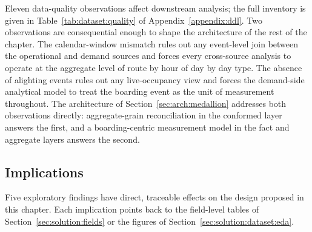 Eleven data-quality observations affect downstream analysis; the full
inventory is given in Table~\ref{tab:dataset:quality} of
Appendix~\ref{appendix:ddl}. Two observations are consequential enough
to shape the architecture of the rest of the chapter. The
calendar-window mismatch rules out any event-level join between the
operational and demand sources and forces every cross-source analysis
to operate at the aggregate level of route by hour of day by day type.
The absence of alighting events rules out any live-occupancy view and
forces the demand-side analytical model to treat the boarding event as
the unit of measurement throughout. The architecture of
Section~\ref{sec:arch:medallion} addresses both observations
directly: aggregate-grain reconciliation in the conformed layer answers
the first, and a boarding-centric measurement model in the fact and
aggregate layers answers the second.

\subsection{Implications}
\label{sec:solution:eda_to_design}

Five exploratory findings have direct, traceable effects on the design
proposed in this chapter. Each implication points back to the field-level
tables of Section~\ref{sec:solution:fields} or the figures of
Section~\ref{sec:solution:dataset:eda}.

